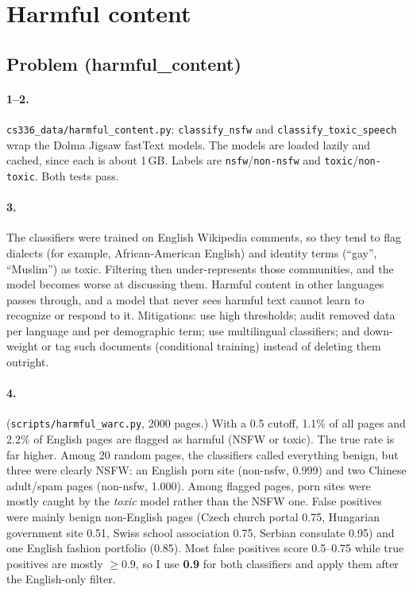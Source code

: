 \documentclass[11pt]{article}
\begin{document}
\section{Harmful content}

\subsection*{Problem (harmful\_content)}

\paragraph{1--2.} \texttt{cs336\_data/harmful\_content.py}: \texttt{classify\_nsfw} and
\texttt{classify\_toxic\_speech} wrap the Dolma Jigsaw fastText models. The models are loaded
lazily and cached, since each is about 1\,GB. Labels are \texttt{nsfw}/\texttt{non-nsfw} and
\texttt{toxic}/\texttt{non-toxic}. Both tests pass.

\paragraph{3.}
The classifiers were trained on English Wikipedia comments, so they tend to flag dialects
(for example, African-American English) and identity terms (``gay'', ``Muslim'') as toxic.
Filtering then under-represents those communities, and the model becomes worse at discussing
them. Harmful content in other languages passes through, and a model that never sees harmful
text cannot learn to recognize or respond to it. Mitigations: use high thresholds; audit
removed data per language and per demographic term; use multilingual classifiers; and
down-weight or tag such documents (conditional training) instead of deleting them outright.

\paragraph{4.} (\texttt{scripts/harmful\_warc.py}, 2000 pages.) With a 0.5 cutoff, 1.1\% of all
pages and 2.2\% of English pages are flagged as harmful (NSFW or toxic). The true rate is far
higher. Among 20 random pages, the classifiers called everything benign, but three were
clearly NSFW: an English porn site (non-nsfw, 0.999) and two Chinese adult/spam pages
(non-nsfw, 1.000). Among flagged pages, porn sites were mostly caught by the \emph{toxic}
model rather than the NSFW one. False positives were mainly benign non-English pages
(Czech church portal 0.75, Hungarian government site 0.51, Swiss school association 0.75, Serbian
consulate 0.95) and one English fashion portfolio (0.85). Most false positives score
0.5--0.75 while true positives are mostly $\geq 0.9$, so I use \textbf{0.9} for both
classifiers and apply them after the English-only filter.
\end{document}
